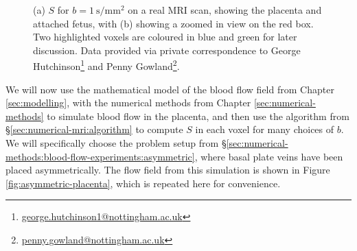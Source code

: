 \begin{figure}
\begin{centering}
\begin{subfigure}{0.5\textwidth}
\begin{centering}
                        \caption{}
                        \label{fig:mri-real:S-zoom}
                    \end{centering}
                \end{subfigure}
            \end{centering}
            \caption{(a) $S$ for $b=\qty{1}{\second\per\milli\metre^2}$ on a real MRI scan, showing the placenta and attached fetus, with (b) showing a zoomed in view on the red box. Two highlighted voxels are coloured in blue and green for later discussion. Data provided via private correspondence to George Hutchinson\protect\footnote{\href{mailto:george.hutchinson1@nottingham.ac.uk}{george.hutchinson1@nottingham.ac.uk}} and Penny Gowland\protect\footnote{\href{mailto:penny.gowland@nottingham.ac.uk}{penny.gowland@nottingham.ac.uk}}.}
            \label{fig:mri-real}
        \end{figure}

        We will now use the mathematical model of the blood flow field from Chapter \ref{sec:modelling}, with the numerical methods from Chapter \ref{sec:numerical-methods} to simulate blood flow in the placenta, and then use the algorithm from \S\ref{sec:numerical-mri:algorithm} to compute $S$ in each voxel for many choices of $b$. We will specifically choose the problem setup from \S\ref{sec:numerical-methods:blood-flow-experiments:asymmetric}, where basal plate veins have been placed asymmetrically. The flow field from this simulation is shown in Figure \ref{fig:asymmetric-placenta}, which is repeated here for convenience.

